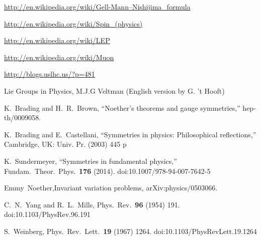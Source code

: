 \begin{thebibliography}{999}
\url{http://en.wikipedia.org/wiki/Gell-Mann–Nishijima_formula}

\url{http://en.wikipedia.org/wiki/Spin_(physics)}

\url{http://en.wikipedia.org/wiki/LEP}

\url{http://en.wikipedia.org/wiki/Muon}

\url{http://blogs.uslhc.us/?p=481}

 Lie Groups in Physics, M.J.G Veltman (English version by G. 't Hooft)

  K.~Brading and H.~R.~Brown,
  ``Noether's theorems and gauge symmetries,''
  hep-th/0009058.


  K.~Brading and E.~Castellani,
  ``Symmetries in physics: Philosophical reflections,''
  Cambridge, UK: Univ. Pr. (2003) 445 p

  K.~Sundermeyer,
  ``Symmetries in fundamental physics,''
  Fundam.\ Theor.\ Phys.\  {\bf 176} (2014).
  doi:10.1007/978-94-007-7642-5

 Emmy~Noether,Invariant variation problems, arXiv:physics/0503066.

  C.~N.~Yang and R.~L.~Mills,
  Phys.\ Rev.\  {\bf 96} (1954) 191.
  doi:10.1103/PhysRev.96.191


  S.~Weinberg,
  Phys.\ Rev.\ Lett.\  {\bf 19} (1967) 1264.
  doi:10.1103/PhysRevLett.19.1264
\end{thebibliography}
